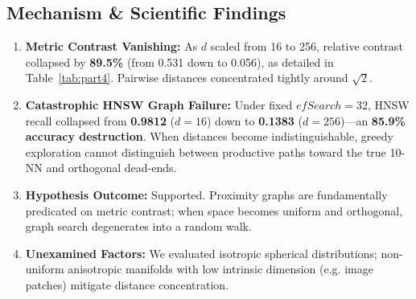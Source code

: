 \documentclass[11pt,a4paper]{article}
\begin{document}
\begin{table}[htbp]
\centering
\small
\caption{Empirical Geometry Degradation on Synthetic Unit Hypersphere ($N=100\text{K}$)}
\label{tab:part4}
\end{table}

\subsection{Mechanism \& Scientific Findings}
\begin{enumerate}
    \item \textbf{Metric Contrast Vanishing:} As $d$ scaled from 16 to 256, relative contrast collapsed by \textbf{89.5\%} (from 0.531 down to 0.056), as detailed in Table~\ref{tab:part4}. Pairwise distances concentrated tightly around $\sqrt{2}$.
    \item \textbf{Catastrophic HNSW Graph Failure:} Under fixed $efSearch=32$, HNSW recall collapsed from \textbf{0.9812} ($d=16$) down to \textbf{0.1383} ($d=256$)---an \textbf{85.9\% accuracy destruction}. When distances become indistinguishable, greedy exploration cannot distinguish between productive paths toward the true 10-NN and orthogonal dead-ends.
    \item \textbf{Hypothesis Outcome:} Supported. Proximity graphs are fundamentally predicated on metric contrast; when space becomes uniform and orthogonal, graph search degenerates into a random walk.
    \item \textbf{Unexamined Factors:} We evaluated isotropic spherical distributions; non-uniform anisotropic manifolds with low intrinsic dimension (e.g. image patches) mitigate distance concentration.
\end{enumerate}
\end{document}
